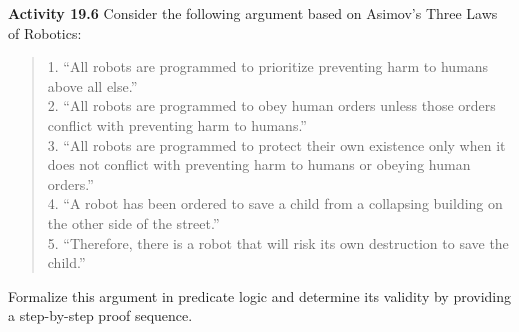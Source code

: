 \documentclass[aspectratio=169]{beamer}
\begin{document}
\begin{frame}[plain]{}

{\bf Activity 19.6} 
Consider the following argument based on Asimov's Three Laws of Robotics:
\begin{quote}
1. ``All robots are programmed to prioritize preventing harm to humans above all else.'' \\
2. ``All robots are programmed to obey human orders unless those orders conflict with preventing harm to humans.'' \\
3. ``All robots are programmed to protect their own existence only when it does not conflict with preventing harm to humans or obeying human orders.'' \\
4. ``A robot has been ordered to save a child from a collapsing building on the other side of the street.'' \\
5. ``Therefore, there is a robot that will risk its own destruction to save the child.''
\end{quote}

Formalize this argument in predicate logic and determine its validity by providing a step-by-step proof sequence.

\end{frame}
\end{document}
